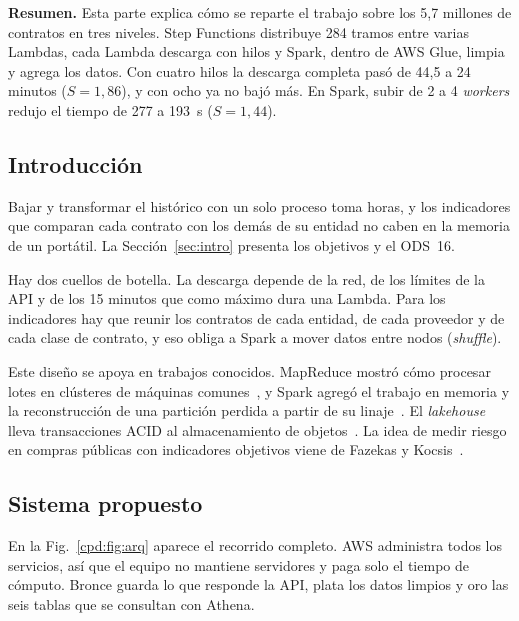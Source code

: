 \noindent\textbf{Resumen.} Esta parte explica cómo se reparte el trabajo sobre los 5,7 millones de contratos en tres niveles. Step Functions distribuye 284 tramos entre varias Lambdas, cada Lambda descarga con hilos y Spark, dentro de AWS Glue, limpia y agrega los datos. Con cuatro hilos la descarga completa pasó de 44,5 a 24 minutos ($S = 1{,}86$), y con ocho ya no bajó más. En Spark, subir de 2 a 4 \textit{workers} redujo el tiempo de 277 a 193~s ($S = 1{,}44$).

\subsection{Introducción}
Bajar y transformar el histórico con un solo proceso toma horas, y los indicadores que comparan cada contrato con los demás de su entidad no caben en la memoria de un portátil. La Sección~\ref{sec:intro} presenta los objetivos y el ODS~16.

Hay dos cuellos de botella. La descarga depende de la red, de los límites de la API y de los 15 minutos que como máximo dura una Lambda. Para los indicadores hay que reunir los contratos de cada entidad, de cada proveedor y de cada clase de contrato, y eso obliga a Spark a mover datos entre nodos (\textit{shuffle}).

Este diseño se apoya en trabajos conocidos. MapReduce mostró cómo procesar lotes en clústeres de máquinas comunes~\cite{dean2008}, y Spark agregó el trabajo en memoria y la reconstrucción de una partición perdida a partir de su linaje~\cite{zaharia2012,zaharia2016}. El \textit{lakehouse} lleva transacciones ACID al almacenamiento de objetos~\cite{armbrust2021}. La idea de medir riesgo en compras públicas con indicadores objetivos viene de Fazekas y Kocsis~\cite{fazekas2020}.

\subsection{Sistema propuesto}
En la Fig.~\ref{cpd:fig:arq} aparece el recorrido completo. AWS administra todos los servicios, así que el equipo no mantiene servidores y paga solo el tiempo de cómputo. Bronce guarda lo que responde la API, plata los datos limpios y oro las seis tablas que se consultan con Athena.

